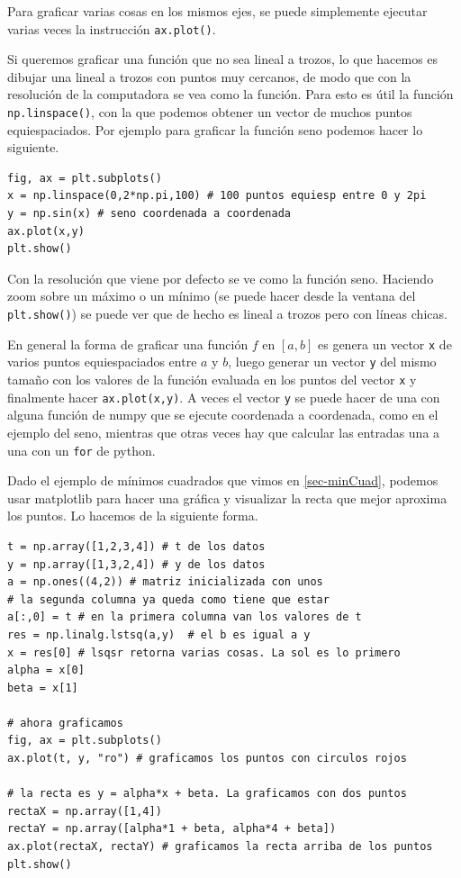 \documentclass[a4paper, 12pt]{report}
\theoremstyle{definition}
\begin{document}
Para graficar varias cosas en los mismos ejes, se puede simplemente ejecutar varias veces la instrucción {\tt ax.plot()}.

Si queremos graficar una función que no sea lineal a trozos, lo que hacemos es dibujar una lineal a trozos con puntos muy cercanos, de modo que con la resolución de la computadora se vea como la función. Para esto es útil la función {\tt np.linspace()}, con la que podemos obtener un vector de muchos puntos equiespaciados. Por ejemplo para graficar la función seno podemos hacer lo siguiente.
\begin{verbatim}
fig, ax = plt.subplots()
x = np.linspace(0,2*np.pi,100) # 100 puntos equiesp entre 0 y 2pi
y = np.sin(x) # seno coordenada a coordenada
ax.plot(x,y)
plt.show()
\end{verbatim}
Con la resolución que viene por defecto se ve como la función seno. Haciendo zoom sobre un máximo o un mínimo (se puede hacer desde la ventana del {\tt plt.show()}) se puede ver que de hecho es lineal a trozos pero con líneas chicas.

En general la forma de graficar una función $f$ en $[a,b]$ es genera un vector {\tt x} de varios puntos equiespaciados entre $a$ y $b$, luego generar un vector {\tt y} del mismo tamaño con los valores de la función evaluada en los puntos del vector {\tt x} y finalmente hacer {\tt ax.plot(x,y)}. A veces el vector {\tt y} se puede hacer de una con alguna función de numpy que se ejecute coordenada a coordenada, como en el ejemplo del seno, mientras que otras veces hay que calcular las entradas una a una con un {\tt for} de python.

Dado el ejemplo de mínimos cuadrados que vimos en \ref{sec-minCuad}, podemos usar matplotlib para hacer una gráfica y visualizar la recta que mejor aproxima los puntos. Lo hacemos de la siguiente forma.
\begin{verbatim}
t = np.array([1,2,3,4]) # t de los datos
y = np.array([1,3,2,4]) # y de los datos
a = np.ones((4,2)) # matriz inicializada con unos
# la segunda columna ya queda como tiene que estar
a[:,0] = t # en la primera columna van los valores de t
res = np.linalg.lstsq(a,y)  # el b es igual a y
x = res[0] # lsqsr retorna varias cosas. La sol es lo primero
alpha = x[0]
beta = x[1]

# ahora graficamos
fig, ax = plt.subplots()
ax.plot(t, y, "ro") # graficamos los puntos con circulos rojos

# la recta es y = alpha*x + beta. La graficamos con dos puntos
rectaX = np.array([1,4])
rectaY = np.array([alpha*1 + beta, alpha*4 + beta])
ax.plot(rectaX, rectaY) # graficamos la recta arriba de los puntos
plt.show()
\end{verbatim}
\end{document}

